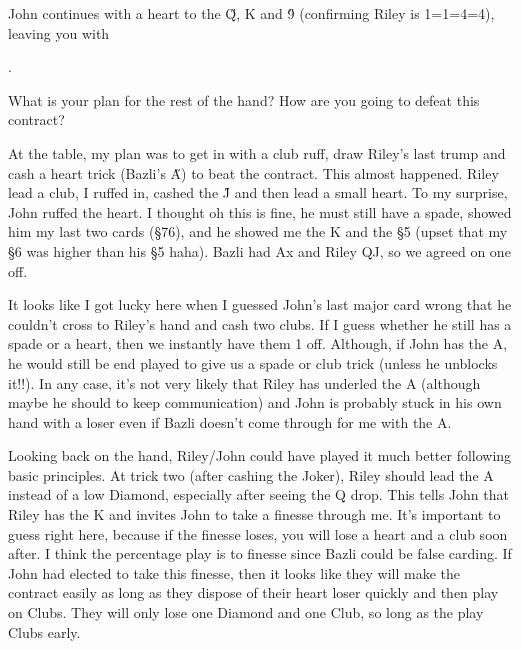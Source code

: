 \documentclass[a4paper]{JoshCards}
\begin{document}
John continues with a heart to the \H Q, \D K and \H 9 (confirming Riley is 1=1=4=4), leaving you with 
\begin{center}
    .
\end{center}
What is your plan for the rest of the hand? How are you going to defeat this contract?

At the table, my plan was to get in with a club ruff, draw Riley's last trump and cash a heart trick (Bazli's \H A) to beat the contract. This almost happened. Riley lead a club, I ruffed in, cashed the \H J and then lead a small heart. To my surprise, John ruffed the heart. I thought oh this is fine, he must still have a spade, showed him my last two cards (\S 76), and he showed me the \C K and the \S 5 (upset that my \S6 was higher than his \S5 haha). Bazli had \C Ax and Riley \C QJ, so we agreed on one off. 

It looks like I got lucky here when I guessed John's last major card wrong that he couldn't cross to Riley's hand and cash two clubs. If I guess whether he still has a spade or a heart, then we instantly have them 1 off. Although, if John has the \C A, he would still be end played to give us a spade or club trick (unless he unblocks it!!). In any case, it's not very likely that Riley has underled the \C A (although maybe he should to keep communication) and John is probably stuck in his own hand with a loser even if Bazli doesn't come through for me with the \C A.  

\gamefont{\larger}
\leftupper{}%
{}{}
\rightlower{}{}{}
\showAll*

Looking back on the hand, Riley/John could have played it much better following basic principles. At trick two (after cashing the Joker), Riley should lead the \D A instead of a low Diamond, especially after seeing the \D Q drop. This tells John that Riley has the \D K and invites John to take a finesse through me. It's important to guess right here, because if the finesse loses, you will lose a heart and a club soon after. I think the percentage play is to finesse since Bazli could be false carding. If John had elected to take this finesse, then it looks like they will make the contract easily as long as they dispose of their heart loser quickly and then play on Clubs. They will only lose one Diamond and one Club, so long as the play Clubs early.
\end{document}
